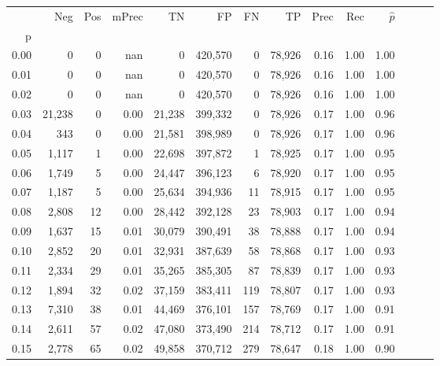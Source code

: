 \begin{tabular}{rrrrrrrrrrrrrr}
\toprule
{} &     Neg &    Pos & mPrec &       TN &       FP &      FN &      TP &  Prec &   Rec & $\hat{p}$ \\
p    &         &        &       &          &          &         &         &       &       &           \\
\midrule
0.00 &       0 &      0 &   nan &        0 &  420,570 &       0 &  78,926 &  0.16 &  1.00 &      1.00 \\
0.01 &       0 &      0 &   nan &        0 &  420,570 &       0 &  78,926 &  0.16 &  1.00 &      1.00 \\
0.02 &       0 &      0 &   nan &        0 &  420,570 &       0 &  78,926 &  0.16 &  1.00 &      1.00 \\
0.03 &  21,238 &      0 &  0.00 &   21,238 &  399,332 &       0 &  78,926 &  0.17 &  1.00 &      0.96 \\
0.04 &     343 &      0 &  0.00 &   21,581 &  398,989 &       0 &  78,926 &  0.17 &  1.00 &      0.96 \\
0.05 &   1,117 &      1 &  0.00 &   22,698 &  397,872 &       1 &  78,925 &  0.17 &  1.00 &      0.95 \\
0.06 &   1,749 &      5 &  0.00 &   24,447 &  396,123 &       6 &  78,920 &  0.17 &  1.00 &      0.95 \\
0.07 &   1,187 &      5 &  0.00 &   25,634 &  394,936 &      11 &  78,915 &  0.17 &  1.00 &      0.95 \\
0.08 &   2,808 &     12 &  0.00 &   28,442 &  392,128 &      23 &  78,903 &  0.17 &  1.00 &      0.94 \\
0.09 &   1,637 &     15 &  0.01 &   30,079 &  390,491 &      38 &  78,888 &  0.17 &  1.00 &      0.94 \\
0.10 &   2,852 &     20 &  0.01 &   32,931 &  387,639 &      58 &  78,868 &  0.17 &  1.00 &      0.93 \\
0.11 &   2,334 &     29 &  0.01 &   35,265 &  385,305 &      87 &  78,839 &  0.17 &  1.00 &      0.93 \\
0.12 &   1,894 &     32 &  0.02 &   37,159 &  383,411 &     119 &  78,807 &  0.17 &  1.00 &      0.93 \\
0.13 &   7,310 &     38 &  0.01 &   44,469 &  376,101 &     157 &  78,769 &  0.17 &  1.00 &      0.91 \\
0.14 &   2,611 &     57 &  0.02 &   47,080 &  373,490 &     214 &  78,712 &  0.17 &  1.00 &      0.91 \\
0.15 &   2,778 &     65 &  0.02 &   49,858 &  370,712 &     279 &  78,647 &  0.18 &  1.00 &      0.90 \\

\end{tabular}

